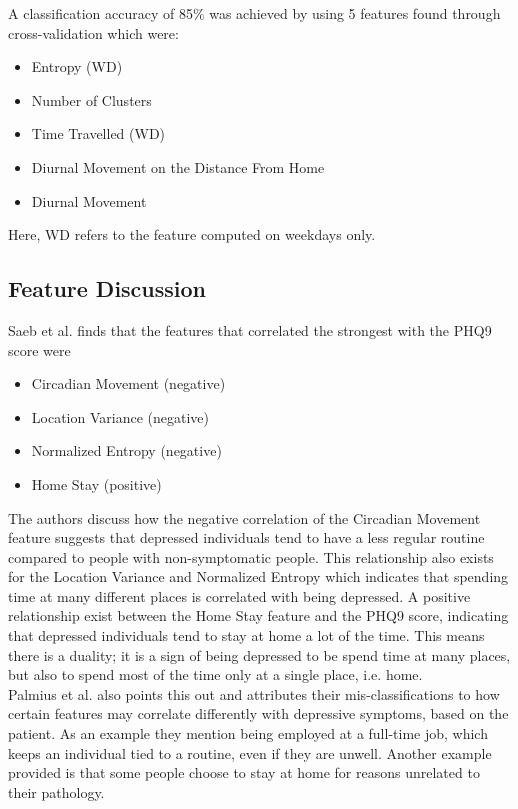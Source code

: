 A classification accuracy of 85\% was achieved by using 5 features found through cross-validation which were:

\begin{itemize}
    \item Entropy (WD)
    \item Number of Clusters
    \item Time Travelled (WD)
    \item Diurnal Movement on the Distance From Home
    \item Diurnal Movement
\end{itemize}

Here, WD refers to the feature computed on weekdays only.\\

\subsection{Feature Discussion}
Saeb et al. finds that the features that correlated the strongest with the PHQ9 score were 
\begin{itemize}
    \item Circadian Movement (negative)
    \item Location Variance (negative)
    \item Normalized Entropy (negative)
    \item Home Stay (positive)
\end{itemize}

The authors discuss how the negative correlation of the Circadian Movement feature suggests that depressed individuals tend to have a less regular routine compared to people with non-symptomatic people. This relationship also exists for the Location Variance and Normalized Entropy which indicates that spending time at many different places is correlated with being depressed. A positive relationship exist between the Home Stay feature and the PHQ9 score, indicating that depressed individuals tend to stay at home a lot of the time. This means there is a duality; it is a sign of being depressed to be spend time at many places, but also to spend most of the time only at a single place, i.e. home.\\

Palmius et al. also points this out and attributes their mis-classifications to how certain features may correlate differently with depressive symptoms, based on the patient. As an example they mention being employed at a full-time job, which keeps an individual tied to a routine, even if they are unwell. Another example provided is that some people choose to stay at home for reasons unrelated to their pathology. 